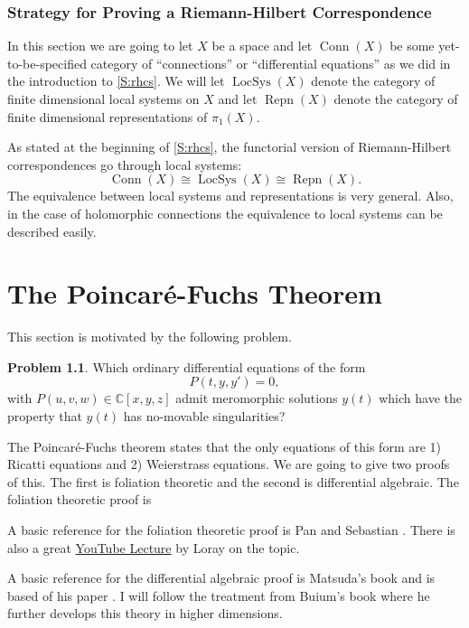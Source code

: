 \documentclass[12pt]{book}
\numberwithin{equation}{section}
\theoremstyle{definition}
\newtheorem{problem}[theorem]{Problem}
\theoremstyle{remark}
\newcommand{\CC}{\mathbb{C}}
\newcommand{\LocSys}{\operatorname{LocSys}}
\newcommand{\Conn}{\operatorname{Conn}}
\newcommand{\Repn}{\operatorname{Repn}}
\begin{document}
\subsection{Strategy for Proving a Riemann-Hilbert Correspondence}\label{S:rhc-strat}
In this section we are going to let $X$ be a space and let $\Conn(X)$ be some yet-to-be-specified category of  ``connections'' or ``differential equations'' as we did in the introduction to \ref{S:rhcs}.
We will let $\LocSys(X)$ denote the category of finite dimensional local systems on $X$ and let $\Repn(X)$ denote the category of finite dimensional representations of $\pi_1(X)$. 

As stated at the beginning of  \ref{S:rhcs}, the functorial version of Riemann-Hilbert correspondences go through local systems:
$$\Conn(X) \cong \LocSys(X) \cong \Repn(X) .$$
The equivalence between local systems and representations is very general. 
Also, in the case of holomorphic connections the equivalence to local systems can be described easily.

\chapter[Poincar\'{e}-Fuchs]{The Poincar\'{e}-Fuchs Theorem}

This section is motivated by the following problem.
\begin{problem}
Which ordinary differential equations of the form
	  $$ P(t,y,y') =0, $$
with $P(u,v,w) \in \CC[x,y,z]$ admit meromorphic solutions $y(t)$ which have the property that $y(t)$ has no-movable singularities? 
\end{problem}
The Poincar\'e-Fuchs theorem states that the only equations of this form are 1) Ricatti equations and 2) Weierstrass equations. 
We are going to give two proofs of this. 
The first is foliation theoretic and the second is differential algebraic. 
The foliation theoretic proof is 

A basic reference for the foliation theoretic proof is Pan and Sebastian \cite{Pan2004}.
There is also a great \href{https://www.youtube.com/watch?v=DoCCm8zjvXQ&list=PL0E0n75oNCDk5tuV-t2_K56sEfLd0Od8H&index=21}{YouTube Lecture} by Loray on the topic. 

A basic reference for the differential algebraic proof is Matsuda's book \cite{Matsuda1980} and is based of his paper \cite{Matsuda1978}.
I will follow the treatment from Buium's book \cite{Buium1986} where he further develops this theory in higher dimensions.
\end{document}
